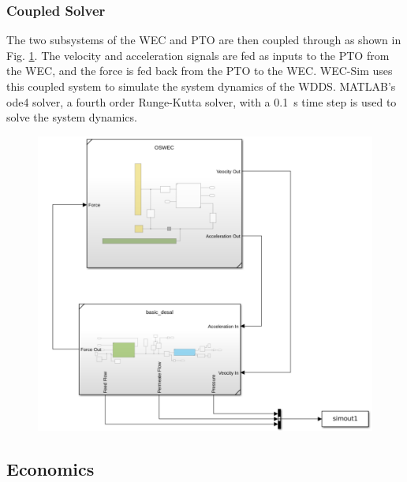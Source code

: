 \documentclass[twocolumn,10pt]{asme2e}
\begin{document}
\subsubsection{Coupled Solver}

The two subsystems of the WEC and PTO are then coupled through as shown in Fig. \ref{fig:coupled_system}. The velocity and acceleration signals are fed as inputs to the PTO from the WEC, and the force is fed back from the PTO to the WEC. WEC-Sim uses this coupled system to simulate the system dynamics of the WDDS. MATLAB's ode4 solver, a fourth order Runge-Kutta solver, with a 0.1~s time step is used to solve the system dynamics. 

\begin{figure}
    \includegraphics[width=0.8\linewidth]{../figs/coupledsimscape.pdf}
    \label{fig:coupled_system}
\end{figure}

\subsection{Economics} \label{sec:econ}
\end{document}
